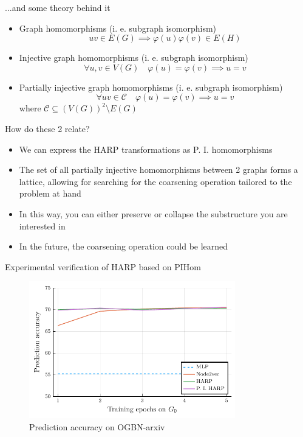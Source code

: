 \documentclass[10pt]{beamer}
\begin{document}
\begin{frame}{...and some theory behind it}
	\begin{itemize}
		\item Graph homomorphisms (i. e. subgraph isomorphism)
\[ uv \in E \left( G \right) \implies \varphi \left( u \right) \varphi \left( v \right) \in E \left( H \right) \]
		\item Injective graph homomorphisms (i. e. subgraph isomorphism)
\[ \forall u, v \in V \left( G \right) \quad \varphi \left( u \right) = \varphi \left( v \right) \implies u = v \]
		\item Partially injective graph homomorphisms (i. e. subgraph isomorphism)
\[ \forall uv \in \mathcal{C} \quad \varphi \left( u \right) = \varphi \left( v \right) \implies u = v \]
			where \( \mathcal{C} \subseteq \left( V \left( G \right) \right)^2 \setminus E \left( G \right) \)
	\end{itemize}
\end{frame}

\begin{frame}{How do these 2 relate?}
	\begin{itemize}
		\item We can express the HARP transformations as P. I. homomorphisms
		\item The set of all partially injective homomorphisms between 2 graphs forms a lattice, allowing for searching for the coarsening operation tailored to the problem at hand
		\item In this way, you can either preserve or collapse the substructure you are interested in
		\item In the future, the coarsening operation could be learned
	\end{itemize}
\end{frame}

\begin{frame}{Experimental verification of HARP based on PIHom}
	\begin{figure}
		\centering
		\includegraphics[width=0.8\textwidth]{images/pihom_comparison/pihom_comparison.pdf}
		\caption{Prediction accuracy on OGBN-arxiv}
	\end{figure}
\end{frame}
\end{document}
